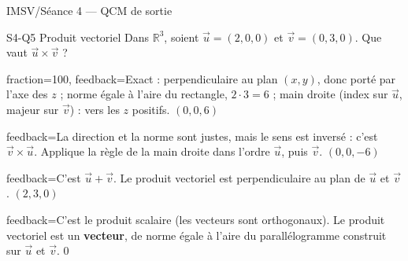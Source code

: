 \documentclass[11pt]{article}
\begin{document}
\begin{quiz}{IMSV/Séance 4 — QCM de sortie}
\begin{multi}[penalty=0, shuffle=true, numbering=abc,
  feedback={$\vec u \times \vec v$ est perpendiculaire au plan de $\vec u$ et $\vec v$, sa norme est
  l'aire du parallélogramme construit sur eux ($\Vert\vec u\Vert \Vert\vec v\Vert \sin\theta$) et son
  sens est donné par la règle de la main droite ; $\vec v \times \vec u = -(\vec u \times \vec v)$.
  Voir \emph{Produit vectoriel dans $\mathbb{R}^3$}.}]{S4-Q5 Produit vectoriel}
Dans $\mathbb{R}^3$, soient $\vec u = (2, 0, 0)$ et $\vec v = (0, 3, 0)$. Que vaut
$\vec u \times \vec v$ ?
\item[fraction=100, feedback={Exact : perpendiculaire au plan $(x, y)$, donc porté par l'axe des
  $z$ ; norme égale à l'aire du rectangle, $2 \cdot 3 = 6$ ; main droite (index sur $\vec u$, majeur
  sur $\vec v$) : vers les $z$ positifs.}]
  $(0, 0, 6)$
\item[feedback={La direction et la norme sont justes, mais le sens est inversé : c'est
  $\vec v \times \vec u$. Applique la règle de la main droite dans l'ordre $\vec u$, puis $\vec v$.}]
  $(0, 0, -6)$
\item[feedback={C'est $\vec u + \vec v$. Le produit vectoriel est perpendiculaire au plan de $\vec u$
  et $\vec v$.}]
  $(2, 3, 0)$
\item[feedback={C'est le produit scalaire (les vecteurs sont orthogonaux). Le produit vectoriel est un
  \textbf{vecteur}, de norme égale à l'aire du parallélogramme construit sur $\vec u$ et $\vec v$.}]
  $0$
\end{multi}

\end{quiz}
\end{document}
